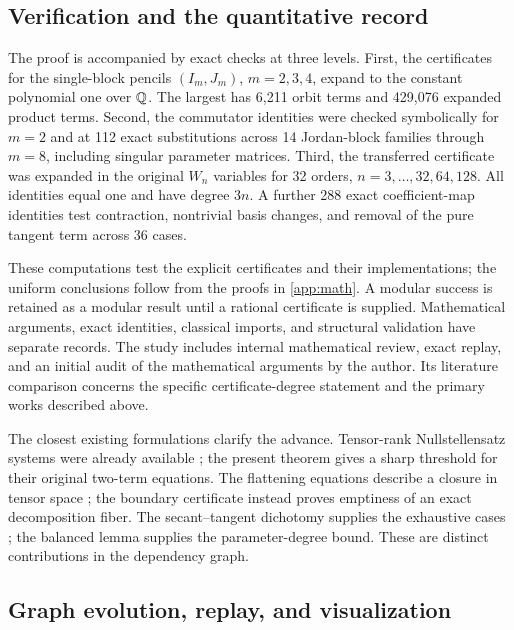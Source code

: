 \subsection{Verification and the quantitative record}\label{sec:case-checks}

The proof is accompanied by exact checks at three levels. First, the certificates for the single-block pencils $(I_m,J_m)$, $m=2,3,4$, expand to the constant polynomial one over $\mathbb{Q}$. The largest has 6,211 orbit terms and 429,076 expanded product terms. Second, the commutator identities were checked symbolically for $m=2$ and at 112 exact substitutions across 14 Jordan-block families through $m=8$, including singular parameter matrices. Third, the transferred certificate was expanded in the original $W_n$ variables for 32 orders, $n=3,\ldots,32,64,128$. All identities equal one and have degree $3n$. A further 288 exact coefficient-map identities test contraction, nontrivial basis changes, and removal of the pure tangent term across 36 cases.

These computations test the explicit certificates and their implementations; the uniform conclusions follow from the proofs in \cref{app:math}. A modular success is retained as a modular result until a rational certificate is supplied. Mathematical arguments, exact identities, classical imports, and structural validation have separate records. The study includes internal mathematical review, exact replay, and an initial audit of the mathematical arguments by the author. Its literature comparison concerns the specific certificate-degree statement and the primary works described above.

The closest existing formulations clarify the advance. Tensor-rank Nullstellensatz systems were already available \cite{aliabadifriedland}; the present theorem gives a sharp threshold for their original two-term equations. The flattening equations describe a closure in tensor space \cite{landsbergmanivel,raicu}; the boundary certificate instead proves emptiness of an exact decomposition fiber. The secant--tangent dichotomy supplies the exhaustive cases \cite[arXiv version, Corollary~1]{ballicobernardi}; the balanced lemma supplies the parameter-degree bound. These are distinct contributions in the dependency graph.

\subsection{Graph evolution, replay, and visualization}\label{sec:visual-effects}

